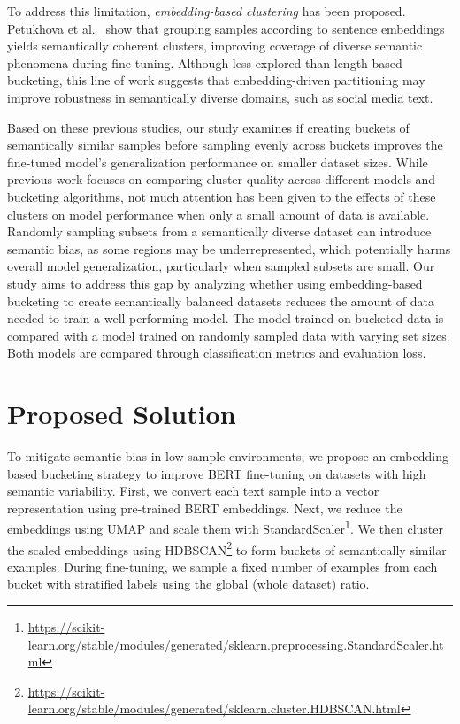 \documentclass[twocolumn]{article}
\newcounter{ex}
\renewcommand{\indent}{\hspace*{2em}}
\begin{document}
\indent To address this limitation, \textit{embedding-based clustering} has been proposed. Petukhova et al.~\cite{petukhova2025text} show that grouping samples according to sentence embeddings yields semantically coherent clusters, improving coverage of diverse semantic phenomena during fine-tuning. Although less explored than length-based bucketing, this line of work suggests that embedding-driven partitioning may improve robustness in semantically diverse domains, such as social media text.

\indent Based on these previous studies, our study examines if creating buckets of semantically similar samples before sampling evenly across buckets improves the fine-tuned model's generalization performance on smaller dataset sizes. While previous work focuses on comparing cluster quality across different models and bucketing algorithms, not much attention has been given to the effects of these clusters on model performance when only a small amount of data is available. Randomly sampling subsets from a semantically diverse dataset can introduce semantic bias, as some regions may be underrepresented, which potentially harms overall model generalization, particularly when sampled subsets are small\cite{shah-etal-2020-predictive}. Our study aims to address this gap by analyzing whether using embedding-based bucketing to create semantically balanced datasets reduces the amount of data needed to train a well-performing model. The model trained on bucketed data is compared with a model trained on randomly sampled data with varying set sizes. Both models are compared through classification metrics and evaluation loss.

\section{Proposed Solution}\label{proposedsolution}
\indent To mitigate semantic bias in low-sample environments, we propose an embedding-based bucketing strategy to improve BERT fine-tuning on datasets with high semantic variability. First, we convert each text sample into a vector representation using pre-trained BERT embeddings. Next, we reduce the embeddings using UMAP and scale them with StandardScaler\footnote{\url{https://scikit-learn.org/stable/modules/generated/sklearn.preprocessing.StandardScaler.html}}. We then cluster the scaled embeddings using HDBSCAN\footnote{\url{https://scikit-learn.org/stable/modules/generated/sklearn.cluster.HDBSCAN.html}} to form buckets of semantically similar examples. During fine-tuning, we sample a fixed number of examples from each bucket with stratified labels using the global (whole dataset) ratio.
\end{document}
